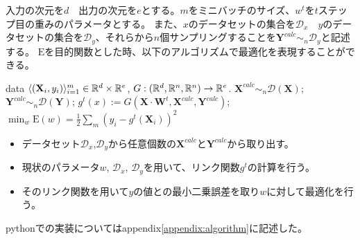 入力の次元を$ d $　出力の次元を$ e $とする。$ m $をミニバッチのサイズ、$ w^t $を$t$ステップ目の重みのパラメータとする。
また、$x$のデータセットの集合を$ \mathcal{D}_x $　$y$のデータセットの集合を$ \mathcal{D}_y $、それらから$n$個サンプリングすることを$ \mathbf{Y}^{calc} \sim_n \mathcal{D}_y $と記述する。
$ \mathrm{E} $を目的関数とした時、以下のアルゴリズムで最適化を表現することができる。



\begin{algorithm}[]
	\caption{\KAF}
	\label{alg:fixed-u-alg}
\begin{algorithmic}
	 data $\langle (\mathbf{X}_i, y_i) \rangle_{i=1}^m \in
	\mathbb{R}^d \times \mathbb{R}^e$, $G: ( \mathbb{R}^d, \mathbb{R}^n, \mathbb{R}^n ) \rightarrow  \mathbb{R}^e$.
	\STATE $\mathbf{X}^{calc} \sim_n \mathcal{D}(\mathbf{X})$;
    \STATE $\mathbf{Y}^{calc} \sim_n \mathcal{D}(\mathbf{Y})$;
	\STATE $g^t(x) := G(\mathbf{X} \cdot  \mathbf{W}^t, \mathbf{X}^{calc}, \mathbf{Y}^{calc} )$;
	\STATE $ \displaystyle{\min_{w} \mathrm{E}(w)} = \frac{1}{2}\sum_m (y_i - g^t(\mathbf{X}_i))^2 $
	\ENDFOR
\end{algorithmic}
\end{algorithm}

\begin{itemize}
  \item データセット$\mathcal{D}_x$,$\mathcal{D}_y$から任意個数の$ \mathbf{X}^{calc} $と$ \mathbf{Y}^{calc} $から取り出す。
  \item 現状のパラメータ$ w $, $\mathcal{D}_x$, $\mathcal{D}_y$を用いて、リンク関数$ g^t $の計算を行う。
  \item そのリンク関数を用いて$ y $の値との最小二乗誤差を取り$ w $に対して最適化を行う。
\end{itemize}


pythonでの実装についてはappendix\ref{appendix:algorithm}に記述した。






